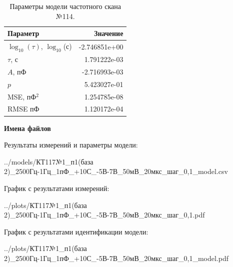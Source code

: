 \begin{table}[!ht]
    \centering
    \caption{Параметры модели частотного скана №114.}
    \begin{tabular}{|l|r|}
        \hline
        Параметр                                       & Значение                  \\ \hline
        $\log_{10}(\tau)$, $\log_{10}$(с)              & -2.746851e+00             \\ \hline
        $\tau$, с                                      & 1.791222e-03              \\ \hline
        $A$, пФ                                        & -2.716993e-03             \\ \hline
        $p$                                            & 5.423027e-01              \\ \hline
        MSE, пФ$^2$                                    & 1.254785e-08              \\ \hline
        RMSE пФ                                        & 1.120172e-04              \\ \hline
    \end{tabular}
    \label{table:frequency_scan_model_114}
\end{table}

\textbf{Имена файлов}

Результаты измерений и параметры модели:

\scriptsize../models/КТ117№1\_п1(база 2)\_2500Гц-1Гц\_1пФ\_+10С\_-5В-7В\_50мВ\_20мкс\_шаг\_0,1\_model.csv
\normalsize

График с результатами измерений:

\scriptsize../plots/КТ117№1\_п1(база 2)\_2500Гц-1Гц\_1пФ\_+10С\_-5В-7В\_50мВ\_20мкс\_шаг\_0,1.pdf
\normalsize

График с результатами идентификации модели:

\scriptsize../plots/КТ117№1\_п1(база 2)\_2500Гц-1Гц\_1пФ\_+10С\_-5В-7В\_50мВ\_20мкс\_шаг\_0,1\_model.pdf
\normalsize

